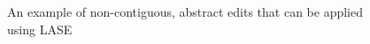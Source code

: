 \begin{figure}
\centering
{}
\caption{An example of non-contiguous, abstract edits that can be applied using LASE~\cite{Meng12:lase}}
\label{fig:lase}
\end{figure}


